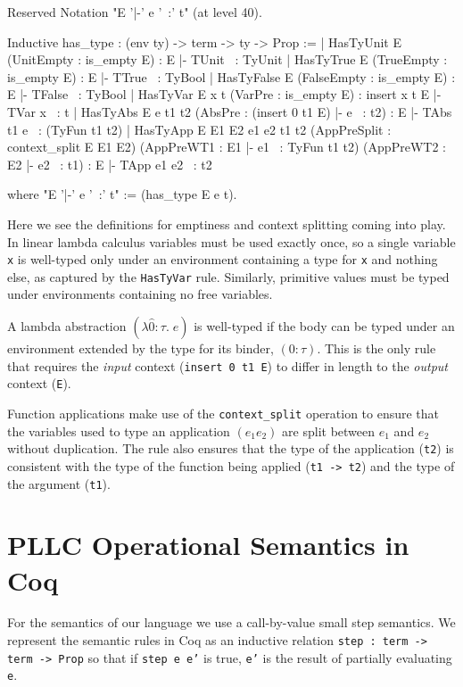 \documentclass[]{unswthesis}
\let\c\texttt
\let\i\textit
\begin{document}
\begin{coqcode}
Reserved Notation "E '|-' e '~:' t" (at level 40).

Inductive has_type : (env ty) -> term -> ty -> Prop :=
  | HasTyUnit E
      (UnitEmpty : is_empty E) :
      E |- TUnit ~: TyUnit
  | HasTyTrue E
      (TrueEmpty : is_empty E) :
      E |- TTrue ~: TyBool
  | HasTyFalse E
      (FalseEmpty : is_empty E) :
      E |- TFalse ~: TyBool
  | HasTyVar E x t
      (VarPre : is_empty E) :
      insert x t E |- TVar x ~: t
  | HasTyAbs E e t1 t2
      (AbsPre : (insert 0 t1 E) |- e ~: t2) :
      E |- TAbs t1 e ~: (TyFun t1 t2)
  | HasTyApp E E1 E2 e1 e2 t1 t2
      (AppPreSplit : context_split E E1 E2)
      (AppPreWT1 : E1 |- e1 ~: TyFun t1 t2)
      (AppPreWT2 : E2 |- e2 ~: t1) :
      E  |- TApp e1 e2 ~: t2

where "E '|-' e '~:' t" := (has_type E e t).
\end{coqcode}

Here we see the definitions for emptiness and context splitting coming into play. In linear lambda calculus variables must be used exactly once, so a single variable \c{x} is well-typed only under an environment containing a type for \c{x} and nothing else, as captured by the \c{HasTyVar} rule. Similarly, primitive values must be typed under environments containing no free variables.

A lambda abstraction $(\lambda \hat{0} : \tau. \; e)$ is well-typed if the body can be typed under an environment extended by the type for its binder, $(0 : \tau)$. This is the only rule that requires the \i{input} context (\c{insert 0 t1 E}) to differ in length to the \i{output} context (\c{E}).

Function applications make use of the \c{context_split} operation to ensure that the variables used to type an application $(e_1 e_2)$ are split between $e_1$ and $e_2$ without duplication. The rule also ensures that the type of the application (\c{t2}) is consistent with the type of the function being applied (\c{t1 -> t2}) and the type of the argument (\c{t1}).

\section{PLLC Operational Semantics in Coq}
\label{app:pllc-op-sems}

For the semantics of our language we use a call-by-value small step semantics. We represent the semantic rules in Coq as an inductive relation \c{step : term -> term -> Prop} so that if \c{step e e'} is true, \c{e'} is the result of partially evaluating \c{e}.
\end{document}
